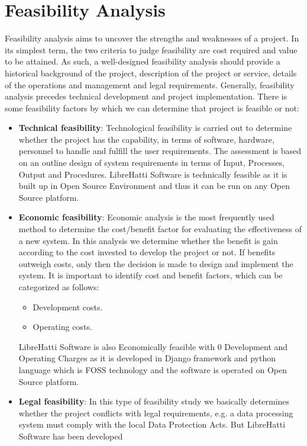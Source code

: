\section{Feasibility Analysis}
Feasibility analysis aims to uncover the strengths and weaknesses of 
a project. In its simplest term, the two criteria to judge feasibility 
are cost required and value to be attained. As such, a well-designed 
feasibility analysis should provide a historical background of the 
project, description of the project or service, details of the 
operations and management and legal requirements. Generally, feasibility 
analysis precedes technical development and project implementation. 
There is some feasibility factors by which we can determine that 
project is feasible or not:
\begin{itemize}
\item {\bf{Technical feasibility}}: Technological feasibility is carried 
out to determine whether the project has the capability, in terms of 
software, hardware, personnel to handle and fulfill the user 
requirements. The assessment is based on an outline design of system 
requirements in terms of Input, Processes, Output and Procedures. LibreHatti Software is technically feasible as it is built up in Open 
Source Environment and thus it can be run on any Open Source platform.
\item {\bf{Economic feasibility}}: Economic analysis is the most 
frequently used method to determine the cost/benefit factor for 
evaluating the effectiveness of a new system. In this analysis we 
determine whether the benefit is gain according to the cost invested 
to develop the project or not. If benefits outweigh costs, only then 
the decision is made to design and implement the system. It is 
important to identify cost and benefit factors, which can be categorized 
as follows:
\begin{itemize}
\item Development costs.
\item Operating costs.
\end{itemize}
LibreHatti Software is also Economically feasible with 0 Development 
and Operating Charges as it is developed in Django framework and python 
language which is FOSS technology and the software is operated on Open 
Source platform.
\item {\bf {Legal feasibility}}: In this type of feasibility study we 
basically determines whether the project conflicts with legal 
requirements, e.g. a data processing system must comply with the local 
Data Protection Acts. But LibreHatti Software has been developed 

\end{itemize}

